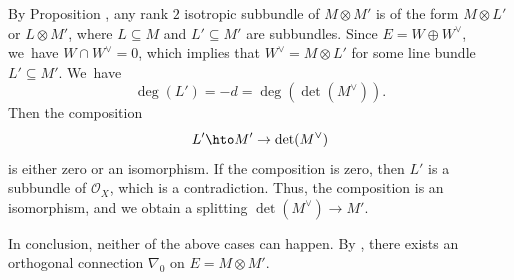\begin{examp}
\begin{itemize}
\begin{enumerate}
By Proposition \cite[Prop.\,4.5]{CH23}, any rank $2$ isotropic subbundle of $M \otimes M'$ is of the form $M \otimes L'$ or $L \otimes M'$, where $L \subseteq M$ and $L' \subseteq M'$ are subbundles. Since $E=W \oplus W^{\vee}$, we~have $W \cap W^{\vee} = 0$, which implies that $W^\vee = M \otimes L'$ for some line bundle $L' \subseteq M'$. We~have
\[
\deg(L') = -d = \deg(\det(M^{\vee})).
\]
Then the composition
\[
L' \hto M' \to \det(M^{\vee})
\]
is either zero or an isomorphism. If the composition is zero, then $L'$ is a subbundle of $\mathcal{O}_X$, which is a contradiction. Thus, the composition is an isomorphism, and we obtain a splitting $\det(M^{\vee}) \to M'$.
\end{enumerate}
\end{itemize}
In conclusion, neither of the above cases can happen. By \cite[Th.\,4.2]{BMW11}, there exists an orthogonal connection $\nabla_0$ on $E = M \otimes M'$.
\end{examp}

